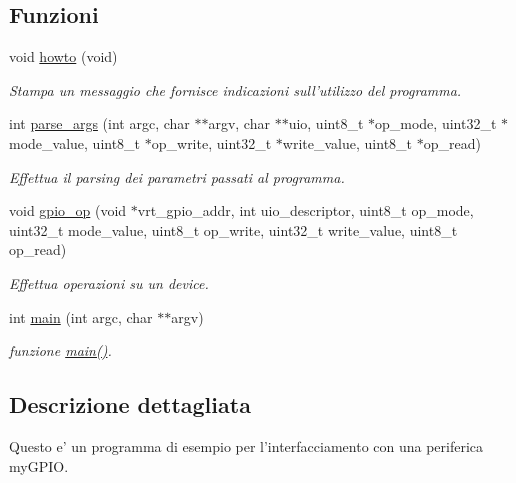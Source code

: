\subsection*{Funzioni}
\begin{DoxyCompactItemize}
\item 
void \hyperlink{group___u_i_o-interrupt_ga05909651fa170a63e98e3f8e13451b7b}{howto} (void)
\begin{DoxyCompactList}\small\item\em Stampa un messaggio che fornisce indicazioni sull'utilizzo del programma. \end{DoxyCompactList}\item 
int \hyperlink{group___u_i_o-interrupt_gab6b18eb1bf7bc996599c06dc6dad8f53}{parse\+\_\+args} (int argc, char $\ast$$\ast$argv, char $\ast$$\ast$uio, uint8\+\_\+t $\ast$op\+\_\+mode, uint32\+\_\+t $\ast$mode\+\_\+value, uint8\+\_\+t $\ast$op\+\_\+write, uint32\+\_\+t $\ast$write\+\_\+value, uint8\+\_\+t $\ast$op\+\_\+read)
\begin{DoxyCompactList}\small\item\em Effettua il parsing dei parametri passati al programma. \end{DoxyCompactList}\item 
void \hyperlink{group___u_i_o-interrupt_ga78b676750c5d08c316cad35ec3963c53}{gpio\+\_\+op} (void $\ast$vrt\+\_\+gpio\+\_\+addr, int uio\+\_\+descriptor, uint8\+\_\+t op\+\_\+mode, uint32\+\_\+t mode\+\_\+value, uint8\+\_\+t op\+\_\+write, uint32\+\_\+t write\+\_\+value, uint8\+\_\+t op\+\_\+read)
\begin{DoxyCompactList}\small\item\em Effettua operazioni su un device. \end{DoxyCompactList}\item 
int \hyperlink{group___u_i_o-interrupt_ga3c04138a5bfe5d72780bb7e82a18e627}{main} (int argc, char $\ast$$\ast$argv)
\begin{DoxyCompactList}\small\item\em funzione \hyperlink{group___u_i_o-interrupt_ga3c04138a5bfe5d72780bb7e82a18e627}{main()}. \end{DoxyCompactList}\end{DoxyCompactItemize}


\subsection{Descrizione dettagliata}
Questo e' un programma di esempio per l'interfacciamento con una periferica my\+G\+P\+I\+O. 

